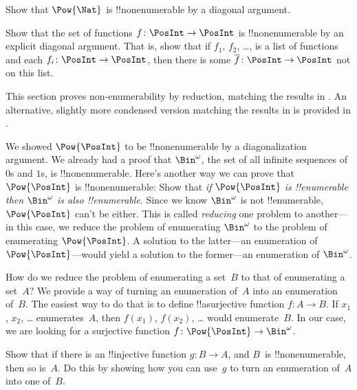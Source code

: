 \begin{prob}
Show that $\Pow{\Nat}$ is !!{nonenumerable} by a diagonal argument.
\end{prob}

\begin{prob}\label{sfr:siz:nen:prob:f-posint}
Show that the set of functions $f \colon \PosInt \to \PosInt$ is
!!{nonenumerable} by an explicit diagonal argument. That is, show that
if $f_1$, $f_2$, \dots, is a list of functions and each $f_i\colon
\PosInt \to \PosInt$, then there is some $\overline{f}\colon \PosInt \to
\PosInt$ not on this list.
\end{prob}







\begin{editorial}
  This section proves non-enumerability by reduction, matching the
  results in . An alternative, slightly more condensed
  version matching the results in  is provided in
  .
\end{editorial}

We showed $\Pow{\PosInt}$ to be !!{nonenumerable} by a diagonalization
argument. We already had a proof that $\Bin^\omega$, the set of all
infinite sequences of $0$s and $1$s, is !!{nonenumerable}.  Here's
another way we can prove that $\Pow{\PosInt}$ is !!{nonenumerable}:
Show that \emph{if $\Pow{\PosInt}$ is !!{enumerable} then $\Bin^\omega$
  is also !!{enumerable}}.  Since we know $\Bin^\omega$ is not
!!{enumerable}, $\Pow{\PosInt}$ can't be either.  This is called
\emph{reducing} one problem to another---in this case, we reduce the
problem of enumerating $\Bin^\omega$ to the problem of enumerating
$\Pow{\PosInt}$.  A solution to the latter---an enumeration of
$\Pow{\PosInt}$---would yield a solution to the former---an enumeration
of $\Bin^\omega$.

How do we reduce the problem of enumerating a set~$B$ to that of
enumerating a set~$A$?  We provide a way of turning an enumeration
of~$A$ into an enumeration of~$B$.  The easiest way to do that is to
define !!a{surjective} function $f\colon A \to B$.  If $x_1$, $x_2$,
\dots{} enumerates~$A$, then $f(x_1)$, $f(x_2)$, \dots{} would
enumerate~$B$.  In our case, we are looking for a surjective
function $f\colon \Pow{\PosInt} \to \Bin^\omega$.

\begin{prob}
Show that if there is an !!{injective} function $g\colon B \to A$, and
$B$~is !!{nonenumerable}, then so is~$A$. Do this by showing how you
can use~$g$ to turn an enumeration of~$A$ into one of~$B$.
\end{prob}

